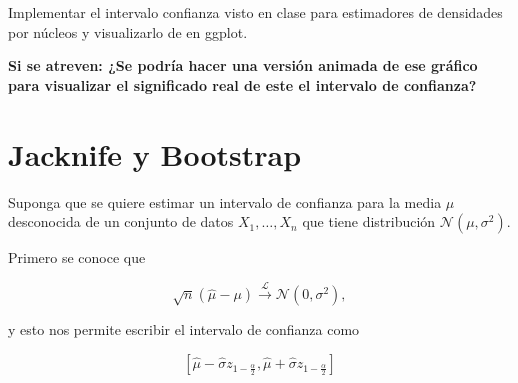 \documentclass[12pt]{book}\usepackage[]{graphicx}\usepackage[]{color}
\theoremstyle{definition}
\theoremstyle{plain}
\begin{document}










 \begin{tarea}{}{}
 Implementar el intervalo confianza visto en clase para estimadores de densidades por núcleos y visualizarlo de en ggplot. 

 \textbf{Si se atreven: ¿Se podría hacer una versión animada de ese gráfico para visualizar el significado real de este el intervalo de confianza?}
 \end{tarea}











\chapter{Jacknife y Bootstrap}

Suponga que se quiere estimar un intervalo de confianza para la media
\(\mu\) desconocida de un conjunto de datos \(X_{1},\ldots, X_{n}\)
que tiene distribución  \(\mathcal{N}\left(\mu ,\sigma^{2}\right)\).

Primero se  conoce que

\begin{equation*}
\sqrt{n}\left( \hat{\mu} - \mu \right)
\xrightarrow{\mathcal{L}} \mathcal{N}\left(0,\sigma^{2}\right),
\end{equation*}

y esto nos permite escribir el intervalo de confianza como

\begin{equation*}
\left[ \hat{\mu} - \hat{\sigma}z_{1-\frac{\alpha}{2}} ,
\hat{\mu} + \hat{\sigma}z_{1-\frac{\alpha}{2}}\right]
\end{equation*}
\end{document}

